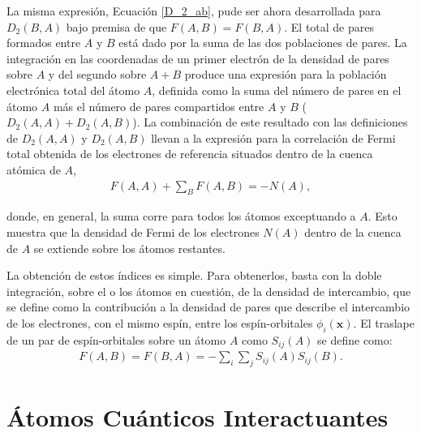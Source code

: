 La misma expresión, Ecuación \ref{D_2_ab}, pude ser ahora desarrollada para
$D_{2}(B, A)$ bajo premisa de que $F(A,B)=F(B,A)$. El total de pares formados
entre $A$ y $B$ está dado por la suma de las dos poblaciones de pares. La
integración en las coordenadas de un primer electrón de la densidad de pares
sobre $A$ y del segundo sobre $A+B$ produce una expresión para la población
electrónica total del átomo $A$, definida como la suma del número de pares en
el átomo $A$ más el número de pares compartidos entre $A$ y $B$ ($D_{2} (A,A) +
D_{2} (A,B)$). La combinación de este resultado con las definiciones de
$D_{2}(A,A)$ y $D_{2}(A,B)$ llevan a la expresión para la correlación de Fermi
total obtenida de los electrones de referencia situados dentro de la cuenca
atómica de $A$,
\begin{align}
  F(A,A) +\sum_{B} F(A,B) =-N(A) ,
\end{align}

\noindent donde, en general, la suma corre para todos los átomos exceptuando a
$A$. Esto muestra que la densidad de Fermi de los electrones $N(A)$ dentro de
la cuenca de $A$ se extiende sobre los átomos restantes.

La obtención de estos índices es simple. Para obtenerlos, basta con la doble
integración, sobre el o los átomos en cuestión, de la densidad de intercambio,
que se define como la contribución a la densidad de pares que describe el
intercambio de los electrones, con el mismo espín, entre los espín-orbitales
$\phi_{i}(\mathbf{x})$. El traslape de un par de espín-orbitales sobre un átomo
$A$ como $S_{ij}(A)$ se define como: 
%
\begin{align}
  F(A,B)=F(B,A)=-\sum_i\sum_j S_{ij}(A)S_{ij}(B).
\end{align}


\section{Átomos Cuánticos Interactuantes}


